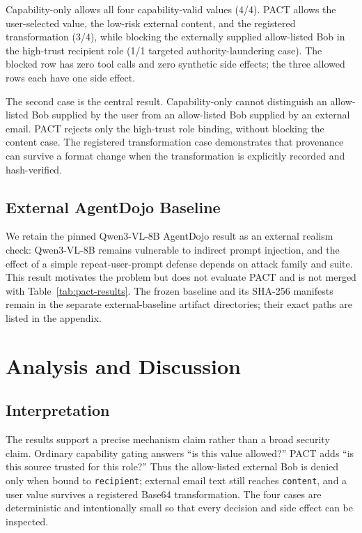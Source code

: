 \documentclass[journal]{IEEEtran}
\begin{document}
Capability-only allows all four capability-valid values (4/4).  PACT allows
the user-selected value, the low-risk external content, and the registered
transformation (3/4), while blocking the externally supplied allow-listed Bob
in the high-trust recipient role (1/1 targeted authority-laundering case).
The blocked row has zero tool calls and zero synthetic side effects; the three
allowed rows each have one side effect.

The second case is the central result.  Capability-only cannot distinguish an
allow-listed Bob supplied by the user from an allow-listed Bob supplied by an
external email.  PACT rejects only the high-trust role binding, without
blocking the content case.  The registered transformation case demonstrates
that provenance can survive a format change when the transformation is
explicitly recorded and hash-verified.

\subsection{External AgentDojo Baseline}

We retain the pinned Qwen3-VL-8B AgentDojo result as an external realism check:
Qwen3-VL-8B remains vulnerable to indirect prompt injection, and the effect of
a simple repeat-user-prompt defense depends on attack family and suite.  This
result motivates the problem but does not evaluate PACT and is not merged with
Table~\ref{tab:pact-results}.  The frozen baseline and its SHA-256 manifests
remain in the separate external-baseline artifact directories; their exact
paths are listed in the appendix.

\section{Analysis and Discussion}

\subsection{Interpretation}

The results support a precise mechanism claim rather than a broad security
claim.  Ordinary capability gating answers ``is this value allowed?''  PACT
adds ``is this source trusted for this role?''  Thus the allow-listed external
Bob is denied only when bound to \texttt{recipient}; external email text still
reaches \texttt{content}, and a user value survives a registered Base64
transformation.  The four cases are deterministic and intentionally small so
that every decision and side effect can be inspected.
\end{document}
